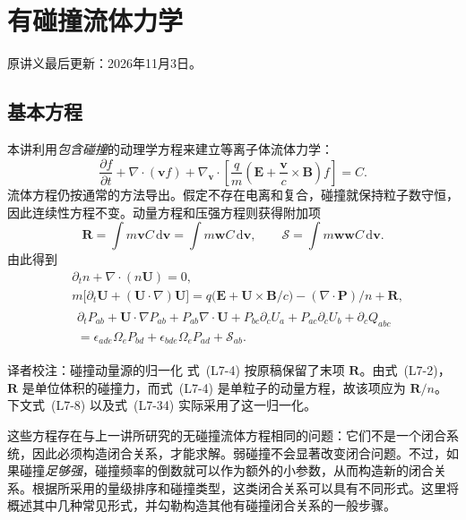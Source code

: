 \chapter{有碰撞流体力学}
\noindent 原讲义最后更新：2026年11月3日。
\section{基本方程}
本讲利用\emph{包含碰撞}的动理学方程来建立等离子体流体力学：
\begin{equation}
\frac{\partial f}{\partial t}+\nabla\cdot(\boldsymbol vf)
+\nabla_{\boldsymbol v}\cdot\left[\frac qm\left(\boldsymbol E+\frac{\boldsymbol v}{c}\times\boldsymbol B\right)f\right]=C.
\tag{L7-1}\label{eq:L7:1}
\end{equation}
流体方程仍按通常的方法导出。假定不存在电离和复合，碰撞就保持粒子数守恒，因此连续性方程不变。动量方程和压强方程则获得附加项
\begin{equation}
\boldsymbol R=\int m\boldsymbol vC\,\mathrm d\boldsymbol v
=\int m\boldsymbol wC\,\mathrm d\boldsymbol v,
\qquad
\boldsymbol{\mathcal S}=\int m\boldsymbol w\boldsymbol wC\,\mathrm d\boldsymbol v.
\tag{L7-2}\label{eq:L7:2}
\end{equation}
由此得到
\begin{align}
&\partial_t n+\nabla\cdot(n\boldsymbol U)=0,
\tag{L7-3}\label{eq:L7:3}\\
&m\bigl[\partial_t\boldsymbol U+(\boldsymbol U\cdot\nabla)\boldsymbol U\bigr]
=q\bigl(\boldsymbol E+\boldsymbol U\times\boldsymbol B/c\bigr)
-(\nabla\cdot\boldsymbol P)/n+\boldsymbol R,
\tag{L7-4}\label{eq:L7:4}\\
&\begin{aligned}
\partial_tP_{ab}+\boldsymbol U\cdot\nabla P_{ab}+P_{ab}\nabla\cdot\boldsymbol U
+P_{bc}\partial_cU_a+P_{ac}\partial_cU_b+\partial_cQ_{abc}
\\{}=\epsilon_{ade}\Omega_eP_{bd}+\epsilon_{bde}\Omega_eP_{ad}+\mathcal S_{ab}.
\end{aligned}
\tag{L7-5}\label{eq:L7:5}
\end{align}
\begin{correction}{译者校注：碰撞动量源的归一化}
式~(L7-4) 按原稿保留了末项 $\boldsymbol R$。由式~(L7-2)，$\boldsymbol R$ 是单位体积的碰撞力，而式~(L7-4) 是单粒子的动量方程，故该项应为 $\boldsymbol R/n$。下文式~(L7-8) 以及式~(L7-34) 实际采用了这一归一化。
\end{correction}
这些方程存在与上一讲所研究的无碰撞流体方程相同的问题：它们不是一个闭合系统，因此必须构造闭合关系，才能求解。弱碰撞不会显著改变闭合问题。不过，如果碰撞\emph{足够强}，碰撞频率的倒数就可以作为额外的小参数，从而构造新的闭合关系。根据所采用的量级排序和碰撞类型，这类闭合关系可以具有不同形式。这里将概述其中几种常见形式，并勾勒构造其他有碰撞闭合关系的一般步骤。

